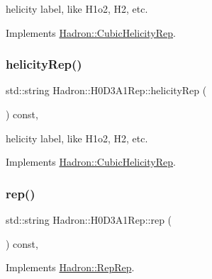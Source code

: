 helicity label, like H1o2, H2, etc. 

Implements \mbox{\hyperlink{structHadron_1_1CubicHelicityRep_af1096946b7470edf0a55451cc662f231}{Hadron\+::\+Cubic\+Helicity\+Rep}}.

\mbox{\label{structHadron_1_1H0D3A1Rep_a6a15df8ab6ee2e04b693258ef6cd02ef}} 
\subsubsection{\texorpdfstring{helicityRep()}{helicityRep()}\hspace{0.1cm}{\footnotesize\ttfamily [2/2]}}
{\footnotesize\ttfamily std\+::string Hadron\+::\+H0\+D3\+A1\+Rep\+::helicity\+Rep (\begin{DoxyParamCaption}{ }\end{DoxyParamCaption}) const\hspace{0.3cm}{\ttfamily [inline]}, {\ttfamily [virtual]}}

helicity label, like H1o2, H2, etc. 

Implements \mbox{\hyperlink{structHadron_1_1CubicHelicityRep_af1096946b7470edf0a55451cc662f231}{Hadron\+::\+Cubic\+Helicity\+Rep}}.

\mbox{\label{structHadron_1_1H0D3A1Rep_a5dae40cb41876bf42a5c9f65ffd5f222}} 
\subsubsection{\texorpdfstring{rep()}{rep()}\hspace{0.1cm}{\footnotesize\ttfamily [1/3]}}
{\footnotesize\ttfamily std\+::string Hadron\+::\+H0\+D3\+A1\+Rep\+::rep (\begin{DoxyParamCaption}{ }\end{DoxyParamCaption}) const\hspace{0.3cm}{\ttfamily [inline]}, {\ttfamily [virtual]}}



Implements \mbox{\hyperlink{structHadron_1_1RepRep_ab3213025f6de249f7095892109575fde}{Hadron\+::\+Rep\+Rep}}.

\mbox{\label{structHadron_1_1H0D3A1Rep_a5dae40cb41876bf42a5c9f65ffd5f222}} 
